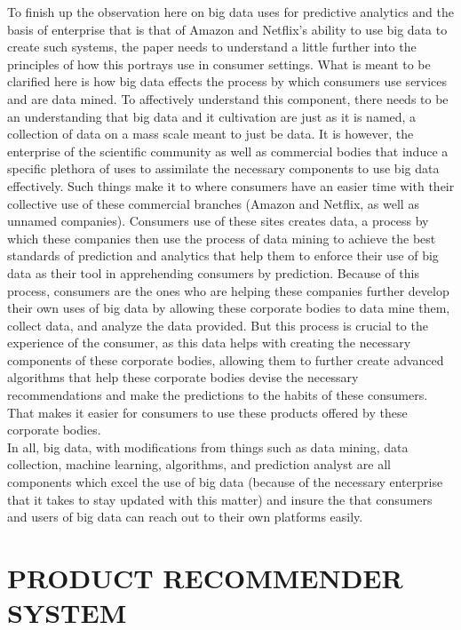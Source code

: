 \documentclass[sigconf]{acmart}
\begin{document}
To finish up the observation here on big data uses for predictive analytics and the basis of enterprise that is that of Amazon and Netflix’s ability to use big data to create such systems, the paper needs to understand a little further into the principles of how this portrays use in consumer settings. What is meant to be clarified here is how big data effects the process by which consumers use services and are data mined. To affectively understand this component, there needs to be an understanding that big data and it cultivation are just as it is named, a collection of data on a mass scale meant to just be data. It is however, the enterprise of the scientific community as well as commercial bodies that induce a specific plethora of uses to assimilate the necessary components to use big data effectively. Such things make it to where consumers have an easier time with their collective use of these commercial branches (Amazon and Netflix, as well as unnamed companies). Consumers use of these sites creates data, a process by which these companies then use the process of data mining to achieve the best standards of prediction and analytics that help them to enforce their use of big data as their tool in apprehending consumers by prediction. Because of this process, consumers are the ones who are helping these companies further develop their own uses of big data by allowing these corporate bodies to data mine them, collect data, and analyze the data provided. But this process is crucial to the experience of the consumer, as this data helps with creating the necessary components of these corporate bodies, allowing them to further create advanced algorithms that help these corporate bodies devise the necessary recommendations and make the predictions to the habits of these consumers. That makes it easier for consumers to use these products offered by these corporate bodies.\\

In all, big data, with modifications from things such as data mining, data collection, machine learning, algorithms, and prediction analyst are all components which excel the use of big data (because of the necessary enterprise that it takes to stay updated with this matter) and insure the that consumers and users of big data can reach out to their own platforms easily. \\

\section{PRODUCT RECOMMENDER SYSTEM}
\end{document}
